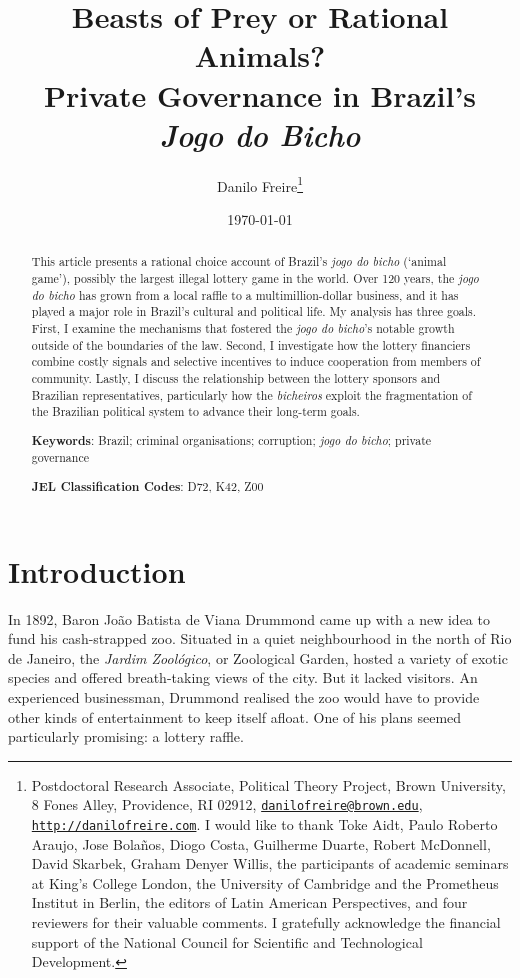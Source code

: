 \documentclass[a4paper,12pt]{article}
\title{\textbf{Beasts of Prey or Rational Animals?\\ Private Governance in Brazil's \textit{Jogo do Bicho}}}
\author{Danilo Freire\thanks{Postdoctoral Research Associate, Political Theory Project, Brown University, 8 Fones Alley, Providence, RI 02912, \href{mailto:danilofreire@brown.edu}{\texttt{danilofreire@brown.edu}}, \href{http://danilofreire.com}{\texttt{http://danilofreire.com}}. I would like to thank Toke Aidt, Paulo Roberto Araujo, Jose Bolaños, Diogo Costa, Guilherme Duarte, Robert McDonnell, David Skarbek, Graham Denyer Willis, the participants of academic seminars at King's College London, the University of Cambridge and the Prometheus Institut in Berlin, the editors of Latin American Perspectives, and four reviewers for their valuable comments. I gratefully acknowledge the financial support of the National Council for Scientific and Technological Development.}
}
\date{\today}
\begin{document}
\maketitle

\begin{abstract}
\noindent
This article presents a rational choice account of Brazil's \textit{jogo do bicho} (`animal game'), possibly the largest illegal lottery game in the world. Over 120 years, the \textit{jogo do bicho} has grown from a local raffle to a multimillion-dollar business, and it has played a major role in Brazil's cultural and political life. My analysis has three goals. First, I examine the mechanisms that fostered the \textit{jogo do bicho}'s notable growth outside of the boundaries of the law. Second, I investigate how the lottery financiers combine costly signals and selective incentives to induce cooperation from members of community. Lastly, I discuss the relationship between the lottery sponsors and Brazilian representatives, particularly how the \textit{bicheiros} exploit the fragmentation of the Brazilian political system to advance their long-term goals. 

 \vspace{.5cm}
 \noindent
 \textbf{Keywords}: Brazil; criminal organisations; corruption; \textit{jogo do bicho}; private governance
  
 \vspace{.25cm}
 \noindent
 \textbf{JEL Classification Codes}: D72, K42, Z00
\end{abstract}

\newpage

\section{Introduction}
\label{sec:intro}

In 1892, Baron João Batista de Viana Drummond came up with a new idea to fund his cash-strapped zoo. Situated in a quiet neighbourhood in the north of Rio de Janeiro, the \textit{Jardim Zoológico}, or Zoological Garden, hosted a variety of exotic species and offered breath-taking views of the city. But it lacked visitors. An experienced businessman, Drummond realised the zoo would have to provide other kinds of entertainment to keep itself afloat. One of his plans seemed particularly promising: a lottery raffle.
\end{document}
